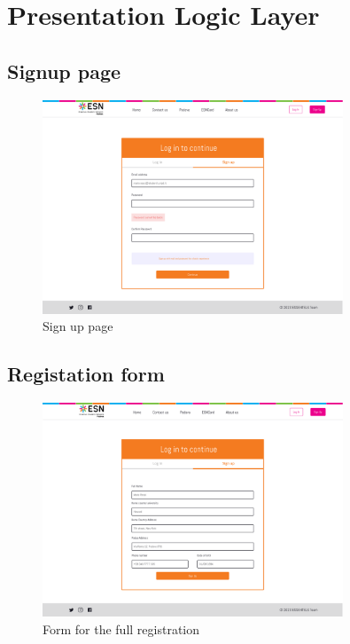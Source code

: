 \section{Presentation Logic Layer}


\lipsum[1]

\subsection{Signup page}
\begin{figure}[h!]
    \centering
    \includegraphics[width=0.8\textwidth]{images/signup.png}
    \caption{Sign up page}
    \label{fig:signup page}
\end{figure}
\lipsum[1]
\subsection{Registation form}
\begin{figure}[h!]
    \centering
    \includegraphics[width=0.8\textwidth]{images/form.png}
    \caption{Form for the full registration}
    \label{fig:form}
\end{figure}
\lipsum[1]
